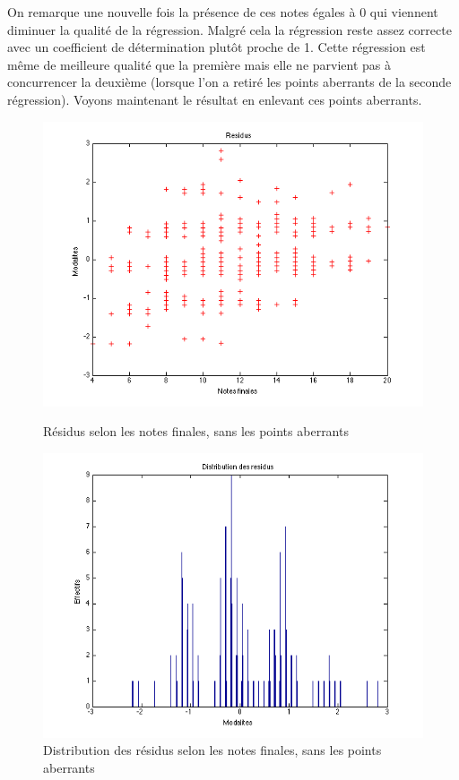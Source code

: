 \documentclass[11pt]{article}
\begin{document}
On remarque une nouvelle fois la présence de ces notes égales à 0 qui viennent diminuer la qualité de la régression. Malgré cela la régression reste assez correcte avec un coefficient de détermination plutôt proche de 1. Cette régression est même de meilleure qualité que la première mais elle ne parvient pas à concurrencer la deuxième (lorsque l'on a retiré les points aberrants de la seconde régression). Voyons maintenant le résultat en enlevant ces points aberrants.

\begin{figure}[h]
\centering
\includegraphics[scale=0.55]{Images/fig22.png}
\caption{Résidus selon les notes finales, sans les points aberrants}
\includegraphics[scale=0.55]{Images/fig23.png}
\caption{Distribution des résidus selon les notes finales, sans les points aberrants}
\end{figure}
\end{document}
